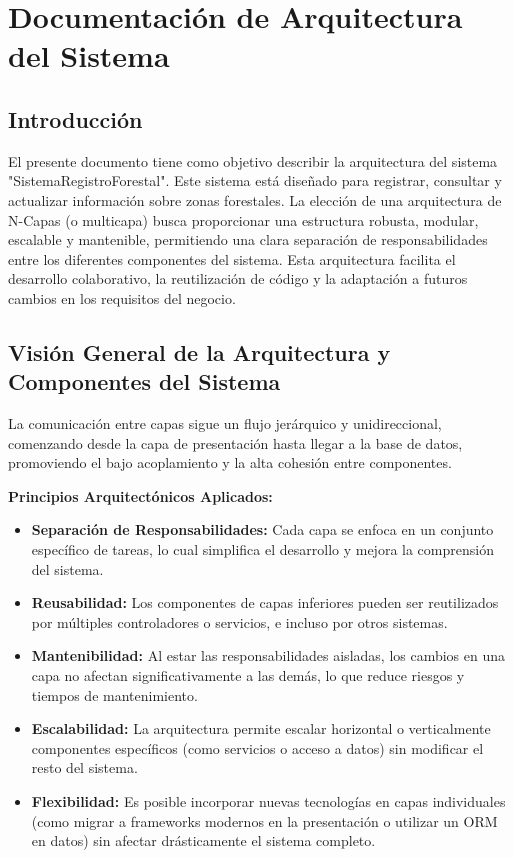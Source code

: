 \chapter{Documentación de Arquitectura del Sistema}
\label{cap:arquitectura}

\section{Introducción}
El presente documento tiene como objetivo describir la arquitectura del sistema "SistemaRegistroForestal". Este sistema está diseñado para registrar, consultar y actualizar información sobre zonas forestales.
La elección de una arquitectura de N-Capas (o multicapa) busca proporcionar una estructura robusta, modular, escalable y mantenible, permitiendo una clara separación de responsabilidades entre los diferentes componentes del sistema. Esta arquitectura facilita el desarrollo colaborativo, la reutilización de código y la adaptación a futuros cambios en los requisitos del negocio.

\section{Visión General de la Arquitectura y Componentes del Sistema}
La comunicación entre capas sigue un flujo jerárquico y unidireccional, comenzando desde la capa de presentación hasta llegar a la base de datos, promoviendo el bajo acoplamiento y la alta cohesión entre componentes.

\textbf{Principios Arquitectónicos Aplicados:}
\begin{itemize}
    \item \textbf{Separación de Responsabilidades:} Cada capa se enfoca en un conjunto específico de tareas, lo cual simplifica el desarrollo y mejora la comprensión del sistema.
    \item \textbf{Reusabilidad:} Los componentes de capas inferiores pueden ser reutilizados por múltiples controladores o servicios, e incluso por otros sistemas.
    \item \textbf{Mantenibilidad:} Al estar las responsabilidades aisladas, los cambios en una capa no afectan significativamente a las demás, lo que reduce riesgos y tiempos de mantenimiento.
    \item \textbf{Escalabilidad:} La arquitectura permite escalar horizontal o verticalmente componentes específicos (como servicios o acceso a datos) sin modificar el resto del sistema.
    \item \textbf{Flexibilidad:} Es posible incorporar nuevas tecnologías en capas individuales (como migrar a frameworks modernos en la presentación o utilizar un ORM en datos) sin afectar drásticamente el sistema completo.
\end{itemize}

